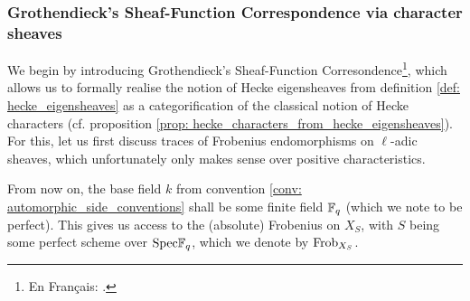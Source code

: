             \subsubsection{Grothendieck's Sheaf-Function Correspondence via character sheaves}
                We begin by introducing Grothendieck's Sheaf-Function Corresondence\footnote{En Français: .}, which allows us to formally realise the notion of Hecke eigensheaves from definition \ref{def: hecke_eigensheaves} as a categorification of the classical notion of Hecke characters (cf. proposition \ref{prop: hecke_characters_from_hecke_eigensheaves}). For this, let us first discuss traces of Frobenius endomorphisms on $\ell$-adic sheaves, which unfortunately only makes sense over positive characteristics.
                \begin{convention} \label{conv: frobenii}
                    From now on, the base field $k$ from convention \ref{conv: automorphic_side_conventions} shall be some finite field $\mathbb{F}_q$ (which we note to be perfect). This gives us access to the (absolute) Frobenius on $X_S$, with $S$ being some perfect scheme over $\mathrm{Spec} \mathbb{F}_q$, which we denote by $\mathrm{Frob}_{X_S}$.
                \end{convention}
                
